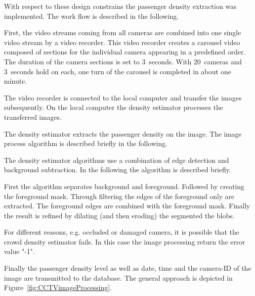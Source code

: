 With respect to these design constrains the passenger density extraction was implemented. The work flow is described in the following.

First, the video streams coming from all cameras are combined into one single video stream by a video recorder. This video recorder creates a carousel video composed of sections for the individual camera appearing in a predefined order. The duration of the camera sections is set to 3~seconds. With 20~cameras and 3~seconds hold on each, one turn of the carousel is completed in about one minute.

The video recorder is connected to the local computer and transfer the images subsequently. On the local computer the density estimator processes the transferred images.

The density estimator extracts the passenger density on the image. The image process algorithm is described briefly in the following.

The density estimator algorithms use a combination of edge detection and background subtraction. In the  following the algorithm is described briefly.

First the algorithm separates background and foreground. Followed by creating the foreground mask.
Through filtering the edges of the foreground only are extracted. The foreground edges are combined with the foreground mask. Finally the result is refined by dilating (and then eroding) the segmented the blobs. %


For different reasons, e.g. occluded or damaged camera, it is possible that the crowd density estimator fails. In this case the image processing return the error value "-1".

Finally the passenger density level as well as date, time and the camera-ID of the image are transmitted to the database. The general approach is depicted in Figure~\ref{fig:CCTVimageProcessing}.

